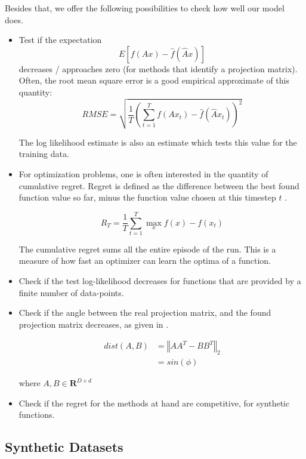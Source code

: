 Besides that, we offer the following possibilities to check how well our model does.

\begin{itemize}
\item Test if the expectation $$ E[ f(A x) - \hat{f}(\hat{A} x) ] $$ decreases / approaches zero (for methods that identify a projection matrix).
Often, the root mean square error is a good empirical approximate of this quantity:
\begin{equation}
RMSE = \sqrt{ \frac{1}{T} (\sum_{t=1}^{T} f(A x_t) - \hat{f}(\hat{A} x_t))^2 }
\end{equation}

The log likelihood estimate is also an estimate which tests this value for the training data.

\item For optimization problems, one is often interested in the quantity of cumulative regret.
Regret is defined as the difference between the best found function value so far, minus the function value chosen at this timestep $t$ \citep{RegretDef}.

\begin{equation}
R_T = \frac{1}{T} \sum_{t=1}^{T} \max_x f(x) - f(x_t)
\end{equation}

The cumulative regret sums all the entire episode of the run.
This is a measure of how fast an optimizer can learn the optima of a function.

\item Check if the test log-likelihood decreases for functions that are provided by a finite number of data-points.

\item Check if the angle between the real projection matrix, and the found projection matrix decreases, as given in \citep{AngleMeasurement}. 

\begin{align}
dist(A, B) &= \left\Vert A A^T - B B^T\right\Vert_2 \\
& = sin( \phi )
\end{align}

where $ A, B \in \mathbf{R}^{D \times d}  $

\item Check if the regret for the methods at hand are competitive, for synthetic functions.

\end{itemize}


\subsection{Synthetic Datasets} \label{syntheticFunction}

